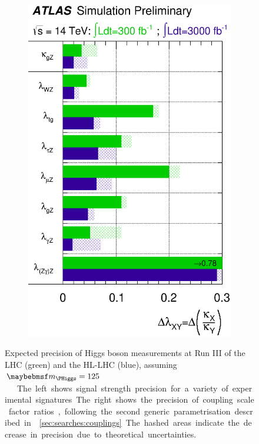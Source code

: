 \begin{figure}[t]
\begin{subfigure}[t]{0.495\textwidth}
		\includegraphics[width=\textwidth]{tex/conclusions/prospects_couplings}
	\end{subfigure}
	\caption{Expected precision of Higgs boson measurements at Run III of the LHC (green) 
	and the HL-LHC (blue), assuming \unit{$\mH = 125$}{\GeV} \cite{ATLAS:prospects}. The 
	left shows signal strength precision for a variety of experimental signatures. The 
	right shows the precision of coupling scale factor ratios, following the second 
	generic parametrisation described in \Section~\ref{sec:searches:couplings}. The hashed 
	areas indicate the decrease in precision due to theoretical uncertainties.}
	\label{fig:concl:prospects}
\end{figure}

